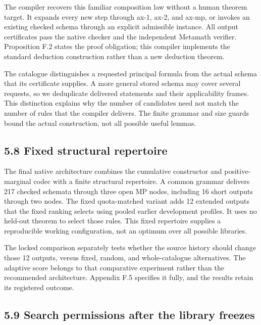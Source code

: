 \documentclass[pdflatex,sn-basic,Numbered]{sn-jnl}
\begin{document}
The compiler recovers this familiar composition law without a human theorem target. It expands every new step through ax-1, ax-2, and ax-mp, or invokes an existing checked schema through an explicit admissible instance. All output certificates pass the native checker and the independent Metamath verifier. Proposition F.2 states the proof obligation; this compiler implements the standard deduction construction rather than a new deduction theorem.

The catalogue distinguishes a requested principal formula from the actual schema that its certificate supplies. A more general stored schema may cover several requests, so we deduplicate delivered statements and their applicability frames. This distinction explains why the number of candidates need not match the number of rules that the compiler delivers. The finite grammar and size guards bound the actual construction, not all possible useful lemmas.

\subsection*{5.8 Fixed structural repertoire}\label{fixed-structural-repertoire}

The final native architecture combines the cumulative constructor and positive-marginal codec with a finite structural repertoire. A common grammar delivers 217 checked schemata through three open MP nodes, including 16 short outputs through two nodes. The fixed quota-matched variant adds 12 extended outputs that the fixed ranking selects using pooled earlier development profiles. It uses no held-out theorem to select those rules. This fixed repertoire supplies a reproducible working configuration, not an optimum over all possible libraries.

The locked comparison separately tests whether the source history should change those 12 outputs, versus fixed, random, and whole-catalogue alternatives. The adaptive score belongs to that comparative experiment rather than the recommended architecture. Appendix F.5 specifies it fully, and the results retain its registered outcome.

\subsection*{5.9 Search permissions after the library freezes}\label{search-permissions-after-the-library-freezes}
\end{document}
